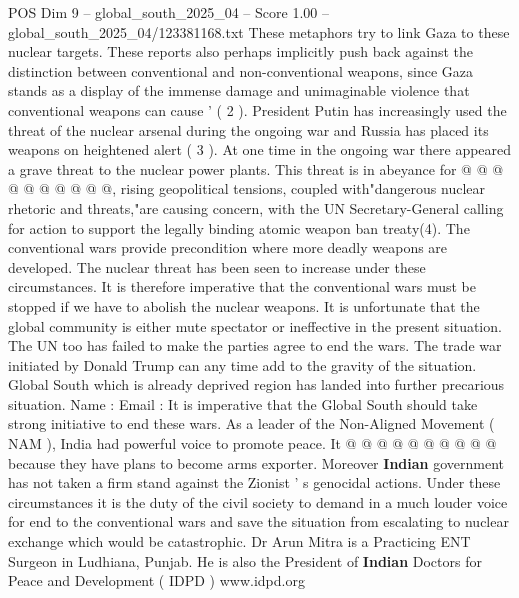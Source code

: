 \begin{textsample}{POS Dim 9 – global\_south\_2025\_04 – Score 1.00 – global\_south\_2025\_04/123381168.txt}
These metaphors try to link Gaza to these nuclear targets.
These reports also perhaps implicitly push back against the distinction between conventional and non-conventional weapons, since Gaza stands as a display of the immense damage and unimaginable violence that conventional weapons can cause ' ( 2 ).
President Putin has increasingly used the threat of the nuclear arsenal during the ongoing war and Russia has placed its weapons on heightened alert ( 3 ).
At one time in the ongoing war there appeared a grave threat to the nuclear power plants.
This threat is in abeyance for @ @ @ @ @ @ @ @ @ @, rising geopolitical tensions, coupled with"dangerous nuclear rhetoric and threats,"are causing concern, with the UN Secretary-General calling for action to support the legally binding atomic weapon ban treaty(4).
The conventional wars provide precondition where more deadly weapons are developed.
The nuclear threat has been seen to increase under these circumstances.
It is therefore imperative that the conventional wars must be stopped if we have to abolish the nuclear weapons.
It is unfortunate that the global community is either mute spectator or ineffective in the present situation.
The UN too has failed to make the parties agree to end the wars.
The trade war initiated by Donald Trump can any time add to the gravity of the situation.
Global South which is already deprived region has landed into further precarious situation.
Name : Email : It is imperative that the Global South should take strong initiative to end these wars.
As a leader of the Non-Aligned Movement ( NAM ), India had powerful voice to promote peace.
It @ @ @ @ @ @ @ @ @ @ because they have plans to become arms exporter.
Moreover \textbf{Indian} government has not taken a firm stand against the Zionist ' s genocidal actions.
Under these circumstances it is the duty of the civil society to demand in a much louder voice for end to the conventional wars and save the situation from escalating to nuclear exchange which would be catastrophic.
Dr Arun Mitra is a Practicing ENT Surgeon in Ludhiana, Punjab.
He is also the President of \textbf{Indian} Doctors for Peace and Development ( IDPD ) www.idpd.org

\end{textsample}
